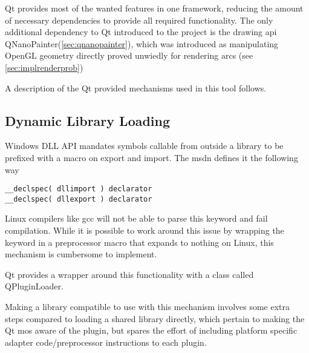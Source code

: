 Qt provides most of the wanted features in one framework, reducing the amount of necessary dependencies to provide all required functionality. The only additional dependency to Qt introduced to the project is the drawing \gls{api} QNanoPainter(\ref{sec:qnanopainter}), which was introduced as manipulating OpenGL geometry directly proved unwiedly for rendering arcs (see \ref{sec:implrenderprob})

A description of the Qt provided mechanisms used in this tool follows.

\subsection{Dynamic Library Loading}
Windows DLL API mandates symbols callable from outside a library to be prefixed with a macro on export and import. The \gls{msdn} defines it the following way
\begin{lstlisting}
__declspec( dllimport ) declarator  
__declspec( dllexport ) declarator  
\end{lstlisting}

Linux compilers like gcc will not be able to parse this keyword and fail compilation. While it is possible to work around this issue by wrapping the keyword in a preprocessor macro that expands to nothing on Linux, this mechanism is cumbersome to implement.

Qt provides a wrapper around this functionality with a class called QPluginLoader.

Making a library compatible to use with this mechanism involves some extra steps compared to loading a shared library directly, which pertain to making the Qt \gls{mos} aware of the plugin, but spares the effort of including platform specific adapter code/preprocessor instructions to each plugin.

